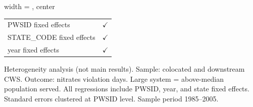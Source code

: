 \begin{table}[htbp]
\begin{adjustbox}{width = \textwidth, center}
\begin{tabular}{lc}
          \\
         
         PWSID fixed effects                          & $\checkmark$\\   
         STATE\_CODE fixed effects                    & $\checkmark$\\   
         year fixed effects                           & $\checkmark$\\   
         
         \bottomrule
         
      \end{tabular}
      
      
      
   \end{adjustbox}
      {\tiny\linespread{1}\selectfont \par \raggedright 
   Heterogeneity analysis (not main results). Sample: colocated and downstream CWS. Outcome: nitrates violation days. Large system = above-median population served. All regressions include PWSID, year, and state fixed effects. Standard errors clustered at PWSID level. Sample period 1985--2005.}
   
\end{table}


